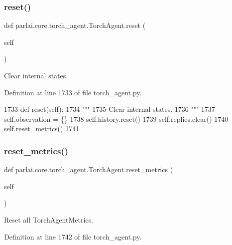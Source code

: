 \subsubsection{\texorpdfstring{reset()}{reset()}}
{\footnotesize\ttfamily def parlai.\+core.\+torch\+\_\+agent.\+Torch\+Agent.\+reset (\begin{DoxyParamCaption}\item[{}]{self }\end{DoxyParamCaption})}

\begin{DoxyVerb}Clear internal states.
\end{DoxyVerb}
 

Definition at line 1733 of file torch\+\_\+agent.\+py.


\begin{DoxyCode}
1733     \textcolor{keyword}{def }reset(self):
1734         \textcolor{stringliteral}{"""}
1735 \textcolor{stringliteral}{        Clear internal states.}
1736 \textcolor{stringliteral}{        """}
1737         self.observation = \{\}
1738         self.history.reset()
1739         self.replies.clear()
1740         self.reset\_metrics()
1741 
\end{DoxyCode}
\mbox{\label{classparlai_1_1core_1_1torch__agent_1_1TorchAgent_a03e18955cfd44dd019d0847bc7a46893}} 
\subsubsection{\texorpdfstring{reset\+\_\+metrics()}{reset\_metrics()}}
{\footnotesize\ttfamily def parlai.\+core.\+torch\+\_\+agent.\+Torch\+Agent.\+reset\+\_\+metrics (\begin{DoxyParamCaption}\item[{}]{self }\end{DoxyParamCaption})}

\begin{DoxyVerb}Reset all TorchAgentMetrics.
\end{DoxyVerb}
 

Definition at line 1742 of file torch\+\_\+agent.\+py.


